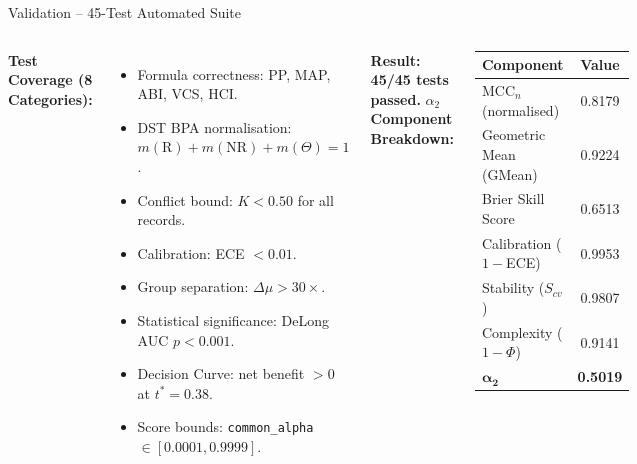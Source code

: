 \documentclass[aspectratio=169]{beamer}
\begin{document}
\begin{frame}{Validation -- 45-Test Automated Suite}
  \begin{columns}[T]
      \textbf{Test Coverage (8 Categories):}
      \begin{itemize}\small
        \item Formula correctness: PP, MAP, ABI, VCS, HCI.
        \item DST BPA normalisation: $m(\mathrm{R})+m(\mathrm{NR})+m(\Theta)=1$.
        \item Conflict bound: $K{<}0.50$ for all records.
        \item Calibration: ECE $<0.01$.
        \item Group separation: $\Delta\mu{>}30\times$.
        \item Statistical significance: DeLong AUC $p{<}0.001$.
        \item Decision Curve: net benefit ${>}0$ at $t^*{=}0.38$.
        \item Score bounds: \texttt{common\_alpha} $\in[0.0001,0.9999]$.
      \end{itemize}
      \vspace{0.3em}
      {\color{teal!80!black}\textbf{Result: 45/45 tests passed.}}
      \textbf{$\alpha_2$ Component Breakdown:}
      \small\begin{center}
      \begin{tabular}{@{}lc@{}}
        \toprule
        \textbf{Component} & \textbf{Value} \\
        \midrule
        $\mathrm{MCC}_n$ (normalised)  & 0.8179 \\
        Geometric Mean (GMean)          & 0.9224 \\
        Brier Skill Score               & 0.6513 \\
        Calibration ($1{-}$ECE)         & 0.9953 \\
        Stability ($S_{cv}$)            & 0.9807 \\
        Complexity ($1{-}\Phi$)         & 0.9141 \\
        \midrule
        $\boldsymbol{\alpha_2}$         & \textbf{0.5019} \\
        \bottomrule
      \end{tabular}
      \end{center}
  \end{columns}
\end{frame}
\end{document}
